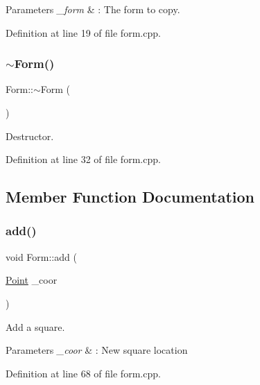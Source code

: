 \begin{DoxyParams}{Parameters}
{\em \+\_\+form} & \+: The form to copy. \\
\hline
\end{DoxyParams}


Definition at line 19 of file form.\+cpp.

\hypertarget{class_form_a9cda7cce41e81bfaca51e922d4f9b98f}{}\label{class_form_a9cda7cce41e81bfaca51e922d4f9b98f} 
\subsubsection{\texorpdfstring{$\sim$\+Form()}{~Form()}}
{\footnotesize\ttfamily Form\+::$\sim$\+Form (\begin{DoxyParamCaption}{ }\end{DoxyParamCaption})}



Destructor. 



Definition at line 32 of file form.\+cpp.



\subsection{Member Function Documentation}
\hypertarget{class_form_a7499275adb667ad101834ff20e286b10}{}\label{class_form_a7499275adb667ad101834ff20e286b10} 
\subsubsection{\texorpdfstring{add()}{add()}\hspace{0.1cm}{\footnotesize\ttfamily [1/2]}}
{\footnotesize\ttfamily void Form\+::add (\begin{DoxyParamCaption}\item[{\hyperlink{struct_point}{Point}}]{\+\_\+coor }\end{DoxyParamCaption})}



Add a square. 


\begin{DoxyParams}{Parameters}
{\em \+\_\+coor} & \+: New square location \\
\hline
\end{DoxyParams}


Definition at line 68 of file form.\+cpp.

